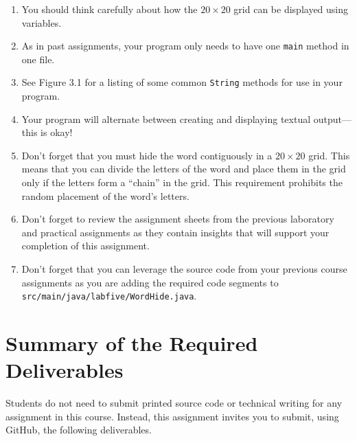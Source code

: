 \documentclass[11pt]{article}
\newcommand{\mainprogramsource}{\lstinline{src/main/java/labfive/WordHide.java}}
\newcommand{\program}[1]{\lstinline{#1}}
\begin{document}
\vspace*{-.05in}

\begin{enumerate}
  \setlength{\itemsep}{0pt}

\item You should think carefully about how the $20 \times 20$ grid can be
  displayed using variables.

\item As in past assignments, your program only needs to have one {\tt main}
  method in one file.

\item See Figure 3.1 for a listing of some common \program{String} methods for
  use in your program.

\item Your program will alternate between creating and displaying textual
  output---this is okay!

\item Don't forget that you must hide the word contiguously in a $20 \times 20$
  grid. This means that you can divide the letters of the word and place them in
  the grid only if the letters form a ``chain'' in the grid. This requirement
  prohibits the random placement of the word's letters.

\item Don't forget to review the assignment sheets from the previous laboratory
  and practical assignments as they contain insights that will support your
  completion of this assignment.

\item Don't forget that you can leverage the source code from your previous
  course assignments as you are adding the required code segments to
  \mainprogramsource{}.

\end{enumerate}
\vspace*{-.15in}

\section*{Summary of the Required Deliverables}

\noindent Students do not need to submit printed source code or technical
writing for any assignment in this course. Instead, this assignment invites you
to submit, using GitHub, the following deliverables.
\end{document}
